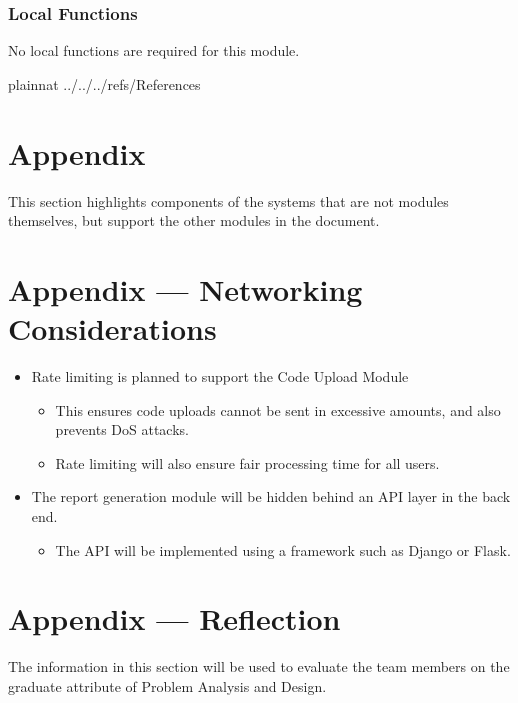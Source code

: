 \documentclass[12pt, titlepage]{article}
\begin{document}
\begin{itemize}
\subsubsection{Local Functions}
No local functions are required for this module.

\newpage

 {plainnat}
 {../../../refs/References}

\newpage

\section{Appendix} \label{Appendix}
This section highlights components of the systems that are not modules themselves, but support the other modules in the document.

\section*{Appendix --- Networking Considerations}
\begin{itemize}
    \item Rate limiting is planned to support the Code Upload Module
    \begin{itemize}
        \item This ensures code uploads cannot be sent in excessive amounts, and also prevents DoS attacks.
        \item Rate limiting will also ensure fair processing time for all users.
    \end{itemize}
    \item The report generation module will be hidden behind an API layer in the back end.
    \begin{itemize}
        \item The API will be implemented using a framework such as Django or Flask.
    \end{itemize}
\end{itemize}

\section*{Appendix --- Reflection}

The information in this section will be used to evaluate the team members on the
graduate attribute of Problem Analysis and Design.




\end{itemize}
\end{document}

